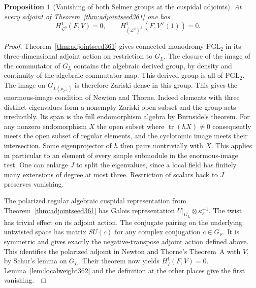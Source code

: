 \documentclass[a4paper,11pt]{article}
\newtheorem{proposition}{Proposition}[section]
\theoremstyle{definition}
\theoremstyle{remark}
\numberwithin{equation}{section}
\begin{document}
\begin{proposition}[Vanishing of both Selmer groups at the cuspidal adjoints]
\label{prop:dualselmer362}
At every adjoint of Theorem~\ref{thm:adjointseed361} one has
\[
 H^1_{\mathcal L^0}(F,V)=0,\qquad
 H^1_{(\mathcal L^0)^\perp}(F,V^\vee(1))=0 .
\]
\end{proposition}
\begin{proof}
Theorem~\ref{thm:adjointseed361} gives connected monodromy
\(\mathrm{PGL}_2\) in its three-dimensional adjoint action on
restriction to \(G_L\). The closure of the image of the
commutator of \(G_L\) contains the algebraic derived group,
by density and continuity of the algebraic commutator map.
This derived group is all of \(\mathrm{PGL}_2\).
The image on \(G_{L(\mu_{\ell^\infty})}\) is therefore Zariski
dense in this group. This gives the enormous-image condition
of Newton and Thorne. Indeed elements with three distinct
eigenvalues form a nonempty Zariski open subset and the group
acts irreducibly. Its span is the full endomorphism algebra
by Burnside's theorem. For any nonzero endomorphism \(X\) the
open subset where \(\operatorname{tr}(hX)\ne0\) consequently
meets the open subset of regular elements, and the cyclotomic
image meets their intersection. Some eigenprojector of \(h\)
then pairs nontrivially with \(X\). This applies in particular
to an element of every simple submodule in the enormous-image
test. One can enlarge \(J\) to split the eigenvalues, since
a local field has finitely many extensions of degree at most
three. Restriction of scalars back to \(J\) preserves vanishing.

The polarized regular algebraic cuspidal representation from
Theorem~\ref{thm:adjointseed361} has Galois representation
\(U|_{G_L}\otimes\kappa_\ell^{-1}\). The twist has trivial effect
on its adjoint action. The conjugate pairing on the underlying
untwisted space has matrix \(S U(c)\) for any complex
conjugation \(c\in G_F\). It is symmetric and gives exactly
the negative-transpose adjoint action defined above. This
identifies the polarized adjoint in Newton and Thorne's
Theorem~A with \(V\), by Schur's lemma on \(G_L\). Their theorem
now yields \(H^1_f(F,V)=0\). Lemma~\ref{lem:localweight362}
and the definition at the other places give the first
vanishing.~\cite{VII-V-VI-nt119}


\end{proof}
\end{document}
